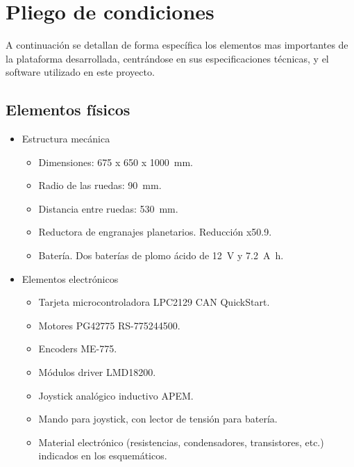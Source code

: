 
\chapter{Pliego de condiciones}
\label{cha:pliego}

A continuación se detallan de forma específica los elementos mas importantes de la plataforma desarrollada, centrándose en sus especificaciones técnicas, y el software utilizado en este proyecto. 

\section{Elementos físicos}

\begin{itemize}
    \item Estructura mecánica
    \begin{itemize}
        \item Dimensiones: 675 x 650 x \SI{1000}{\milli\meter}. 
        \item Radio de las ruedas: \SI{90}{\milli\meter}.
        \item Distancia entre ruedas: \SI{530}{\milli\meter}.
        \item Reductora de engranajes planetarios. Reducción x50.9.
        \item Batería. Dos baterías de plomo ácido de \SI{12}{\volt} y \SI{7.2}{\ampere\hour}.
    \end{itemize}
\end{itemize}

\begin{itemize}
    \item Elementos electrónicos
    \begin{itemize}
        \item Tarjeta microcontroladora LPC2129 CAN QuickStart.
        \item Motores PG42775 RS-775244500.
        \item Encoders ME-775.
        \item Módulos driver LMD18200.
        \item Joystick analógico inductivo APEM.
        \item Mando para joystick, con lector de tensión para batería.
        \item Material electrónico (resistencias, condensadores, transistores, etc.) indicados en los esquemáticos.
    \end{itemize}
\end{itemize}

